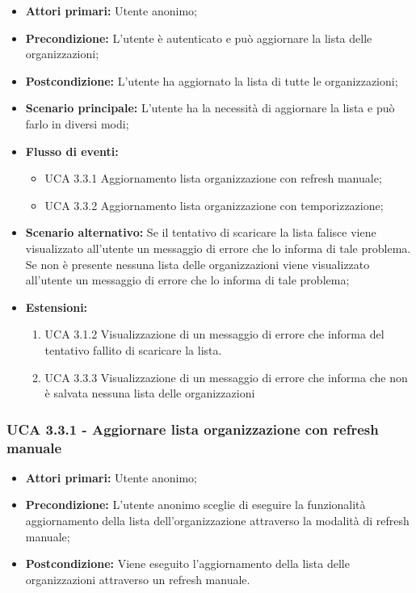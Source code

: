 \begin{itemize} 
	\item \textbf{Attori primari:} Utente anonimo;
	\item \textbf{Precondizione:} L'utente è autenticato e può aggiornare la lista delle organizzazioni;
	\item \textbf{Postcondizione:} L'utente ha aggiornato la lista di tutte le organizzazioni;
	\item \textbf{Scenario principale:}  L'utente ha la necessità di aggiornare la lista e può farlo in diversi modi;
	\item \textbf{Flusso di eventi:}
	\begin{itemize}
		\item UCA 3.3.1 Aggiornamento lista organizzazione con refresh manuale;
		\item UCA 3.3.2 Aggiornamento lista organizzazione con temporizzazione;
	\end{itemize}
	\item \textbf{Scenario alternativo:} Se il tentativo di scaricare la lista falisce viene visualizzato all'utente un messaggio di errore che lo informa di tale problema. Se non è presente nessuna lista delle organizzazioni viene visualizzato all'utente un messaggio di errore che lo informa di tale problema;
	\item \textbf{Estensioni:}
	\begin{enumerate}
		\item UCA 3.1.2 Visualizzazione di un messaggio di errore che informa del tentativo fallito di scaricare la lista.
		\item UCA 3.3.3 Visualizzazione di un messaggio di errore che informa che non è salvata nessuna lista delle organizzazioni
	\end{enumerate}
\end{itemize}

\subsubsection{UCA 3.3.1 - Aggiornare lista organizzazione con refresh manuale}%
\begin{itemize}
	\item \textbf{Attori primari:} Utente anonimo;
	\item \textbf{Precondizione:} L'utente anonimo sceglie di eseguire la funzionalità aggiornamento della lista dell'organizzazione attraverso la modalità di refresh manuale;
	\item \textbf{Postcondizione:} Viene eseguito l'aggiornamento della lista delle organizzazioni attraverso un refresh manuale.
	
\end{itemize}

